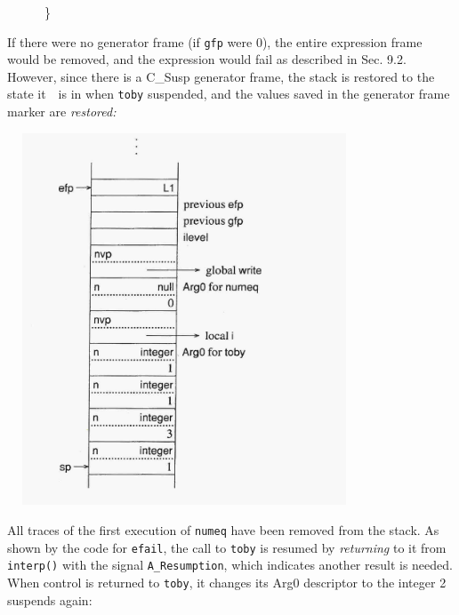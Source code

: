 {\ttfamily\mdseries
\ \ \ \ \ \ \}}


If there were no generator frame (if \texttt{gfp} were 0), the entire
expression frame would be removed, and the expression would fail as
described in Sec. 9.2. However, since there is a C\_Susp generator
frame, the stack is restored to the state it\ \ is in when
\texttt{toby} suspended, and the values saved in the generator frame
marker are \textit{restored:}


\ \  \includegraphics[width=3.848in,height=4.361in]{ib-img/ib-img069.jpg} 


All traces of the first execution of \texttt{numeq} have been removed
from the stack. As shown by the code for \texttt{efail}, the call to
\texttt{toby} is resumed by \textit{returning} to it from
\texttt{interp()} with the signal \texttt{A\_Resumption}, which
indicates another result is needed. When control is returned to
\texttt{toby}, it changes its Arg0 descriptor to the integer 2
suspends again:


